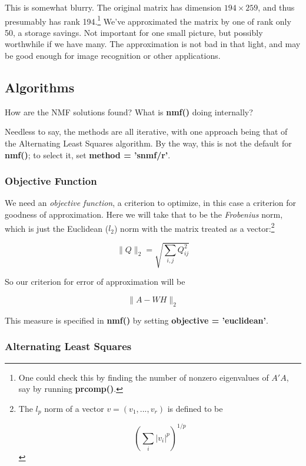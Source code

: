 This is somewhat blurry.  The original matrix has dimension $194 \times
259$, and thus presumably has rank 194.\footnote{One could check this by
finding the number of nonzero eigenvalues of $A'A$, say by running
\textbf{prcomp()}.} We've approximated the matrix by one of rank only
50, a storage savings.  Not important for one small picture, but
possibly worthwhile if we have many. The approximation is not bad in
that light, and may be good enough for image recognition or other
applications.

\subsection{Algorithms}

How are the NMF solutions found?  What is {\bf nmf()} doing internally?

Needless to say, the methods are all iterative, with one approach being
that of the Alternating Least Squares algorithm.  By the way, this is
not the default for {\bf nmf()}; to select it, set {\bf method =
'snmf/r'}.

\subsubsection{Objective Function}

We need an {\it objective function}, a criterion to optimize, in this
case a criterion for goodness of approximation. Here we will take that
to be the {\it Frobenius} norm, which is just the Euclidean ($l_2$)
norm with the matrix treated as a vector:\footnote{The $l_p$ norm of a
vector $v = (v_1,...,v_r)$ is defined to be

$$
\left (\sum_i |v_i|^p \right )^{1/p}
$$
}

\begin{equation}
\label{froben}
\|Q\|_2 = 
\sqrt{
\sum_{i,j} Q_{ij}^2
}
\end{equation}

So our criterion for error of approximation will be

\begin{equation}
\label{errawh}
\|A - WH\|_2
\end{equation}

This measure is specified in {\bf nmf()} by setting {\bf objective =
'euclidean'}.

\subsubsection{Alternating Least Squares}

